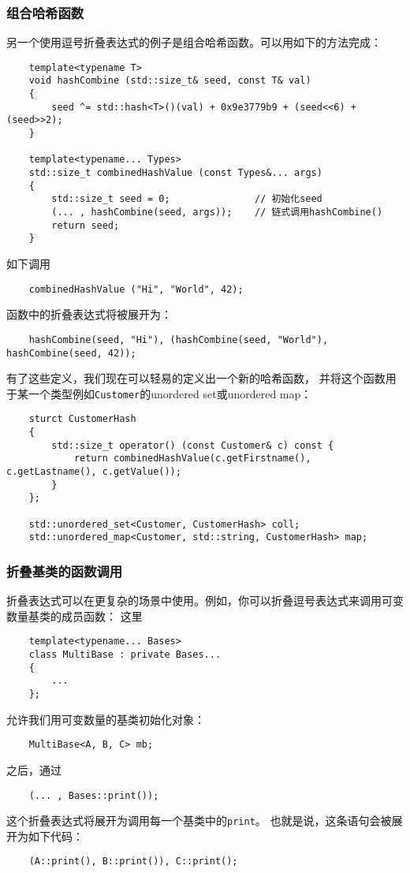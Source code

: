 \subsubsection{组合哈希函数}
另一个使用逗号折叠表达式的例子是组合哈希函数。可以用如下的方法完成：
\begin{lstlisting}
    template<typename T>
    void hashCombine (std::size_t& seed, const T& val)
    {
        seed ^= std::hash<T>()(val) + 0x9e3779b9 + (seed<<6) + (seed>>2);
    }

    template<typename... Types>
    std::size_t combinedHashValue (const Types&... args)
    {
        std::size_t seed = 0;               // 初始化seed
        (... , hashCombine(seed, args));    // 链式调用hashCombine()
        return seed;
    }
\end{lstlisting}
如下调用
\begin{lstlisting}
    combinedHashValue ("Hi", "World", 42);
\end{lstlisting}
函数中的折叠表达式将被展开为：
\begin{lstlisting}
    hashCombine(seed, "Hi"), (hashCombine(seed, "World"), hashCombine(seed, 42));
\end{lstlisting}
有了这些定义，我们现在可以轻易的定义出一个新的哈希函数，
并将这个函数用于某一个类型例如\texttt{Customer}的unordered set或unordered map：
\begin{lstlisting}
    sturct CustomerHash
    {
        std::size_t operator() (const Customer& c) const {
            return combinedHashValue(c.getFirstname(), c.getLastname(), c.getValue());
        }
    };

    std::unordered_set<Customer, CustomerHash> coll;
    std::unordered_map<Customer, std::string, CustomerHash> map;
\end{lstlisting}

\subsubsection{折叠基类的函数调用}
折叠表达式可以在更复杂的场景中使用。例如，你可以折叠逗号表达式来调用可变数量基类的成员函数：
这里
\begin{lstlisting}
    template<typename... Bases>
    class MultiBase : private Bases...
    {
        ...
    };
\end{lstlisting}
允许我们用可变数量的基类初始化对象：
\begin{lstlisting}
    MultiBase<A, B, C> mb;
\end{lstlisting}
之后，通过
\begin{lstlisting}
    (... , Bases::print());
\end{lstlisting}
这个折叠表达式将展开为调用每一个基类中的\texttt{print}。
也就是说，这条语句会被展开为如下代码：
\begin{lstlisting}
    (A::print(), B::print()), C::print();
\end{lstlisting}

